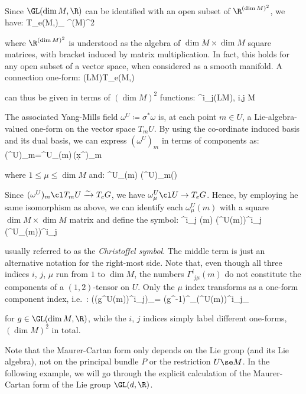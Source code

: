 Since $\GL(\dim M,\R)$ can be identified with an open subset of $\R^{(\dim M)^2}$, we have:
\bse
T_e\GL(\dim M,\R)\cong_{} \R^{(\dim M)^2}
\ese

where $\R^{(\dim M)^2}$ is understood as the algebra of $\dim M \times \dim M$ square matrices, with bracket induced
by matrix multiplication. In fact, this holds for any open subset of a vector space, when considered as a smooth
manifold. A connection one-form:
\bse
\omega\cl \Gamma(LM)\xrightarrow{\sim}T_e\GL(\dim M,\R)
\ese

can thus be given in terms of $(\dim M)^2$ functions:
\bse
\omega^i_{\phantom{i}j}\cl \Gamma(LM)\xrightarrow{\sim}\R, \leq i,j \leq \dim M
\ese

The associated Yang-Mills field $\omega^U \coloneqq \sigma^*\omega$ is, at each point $m\in U$, a Lie-algebra-valued
one-form on the vector space $T_m U$. By using the co-ordinate induced basis and its dual basis, we can express $
(\omega^U)_m$ in terms of components as:
\bse
(\omega^U)_m=\omega^U_\mu(m)\,(\d x^\mu)_m
\ese

where $1\leq \mu \leq \dim M$ and:
\bse
\omega^U_\mu(m) \coloneqq (\omega^U)_m\biggl(\biggr)
\ese

Since $(\omega^U)_m\cl T_m U\xrightarrow{\sim}T_e G$, we have $\omega^U_\mu\cl U \to T_e G$. Hence, by employing he
same isomorphism as above, we can identify each $\omega^U_\mu(m)$ with a square $\dim M \times \dim M$ matrix and
define the symbol:
\bse
\Gamma^i_{\phantom{i}j\mu} (m) \coloneqq (\omega^U(m))^i_{\phantom{i}j\mu} \coloneqq (\omega^U_\mu(m))^i_{\phantom{i}j}
\ese

usually referred to as the \emph{Christoffel symbol}. The middle term is just an alternative notation for the
right-most side. Note that, even though all three indices $i$, $j$, $\mu$ run from $1$ to $\dim M$, the numbers
$\Gamma^i_{\phantom{i}j\mu} (m)$ do not constitute the components of a $(1,2)$-tensor on $U$. Only the $\mu$ index
transforms as a one-form component index, i.e.\ :
\bse
((g\lacts \omega^U(m))^i_{\phantom{i}j})_\mu = (g^{-1})^{\nu}_{\phantom{\mu}}(\omega^U(m))^i_{\phantom{i}j_\nu}
\ese

for $g\in \GL(\dim M,\R)$, while the $i$, $j$ indices simply label different one-forms, $(\dim M)^2$ in total.
\ee

Note that the Maurer-Cartan form only depends on the Lie group (and its Lie algebra), not on the principal bundle $P$
or the restriction $U\se M$. In the following example, we will go through the explicit calculation of the
Maurer-Cartan form of the Lie group $\GL(d, \R)$.

